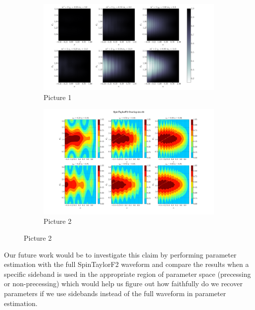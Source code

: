 \begin{figure}
  \begin{subfigure}[b]{0.5\textwidth}
    \includegraphics[width=\textwidth]{./images/OVLP_GRID_P2.pdf}
    \caption{Picture 1}
    \centering
    \label{fig:1}
  \end{subfigure}
  \begin{subfigure}[b]{0.5\textwidth}
    \includegraphics[width=\textwidth]{./images/OVLP_GRID_P0.pdf}
    \caption{Picture 2}
    \centering
    \label{fig:2}
  \end{subfigure}
\end{figure}

Our future work would be to investigate this claim by performing parameter estimation with the full SpinTaylorF2 waveform and compare the results when a specific sideband is used in the appropriate region of parameter space (precessing or non-precessing) which would help us figure out how faithfully do we recover parameters if we use sidebands instead of the full waveform in parameter estimation.








